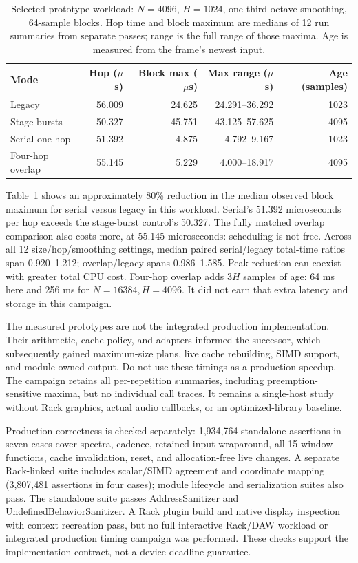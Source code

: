 \documentclass[11pt,letterpaper]{article}
\begin{document}
\begin{table}[tb]
\centering\small
\begin{tabular}{@{}lrrrr@{}}
\toprule
Mode & Hop ($\mu$s) & Block max ($\mu$s) & Max range ($\mu$s) & Age (samples) \\
\midrule
Legacy & 56.009 & 24.625 & 24.291--36.292 & 1023 \\
Stage bursts & 50.327 & 45.751 & 43.125--57.625 & 4095 \\
Serial one hop & 51.392 & 4.875 & 4.792--9.167 & 1023 \\
Four-hop overlap & 55.145 & 5.229 & 4.000--18.917 & 4095 \\
\bottomrule
\end{tabular}
\caption{Selected prototype workload: $N=4096$, $H=1024$, one-third-octave smoothing, 64-sample blocks. Hop time and block maximum are medians of 12 run summaries from separate passes; range is the full range of those maxima. Age is measured from the frame's newest input.}
\label{tab:pipeline}
\end{table}

Table~\ref{tab:pipeline} shows an approximately 80\% reduction in the median
observed block maximum for serial versus legacy in this workload. Serial's
51.392 microseconds per hop exceeds the stage-burst control's 50.327. The
fully matched overlap comparison also costs more, at 55.145 microseconds:
scheduling is not free. Across all 12 size/hop/smoothing settings, median paired
serial/legacy total-time ratios span 0.920--1.212; overlap/legacy spans
0.986--1.585. Peak reduction can coexist with greater total CPU cost. Four-hop
overlap adds $3H$ samples of age: 64 ms here and 256 ms for $N=16384,H=4096$.
It did not earn that extra latency and storage in this campaign.

The measured prototypes are not the integrated production implementation.
Their arithmetic, cache policy, and adapters informed the successor, which
subsequently gained maximum-size plans, live cache rebuilding, SIMD support,
and module-owned output. Do not use these timings as a production speedup.
The campaign retains all per-repetition summaries, including preemption-sensitive
maxima, but no individual call traces. It remains a single-host study without
Rack graphics, actual audio callbacks, or an optimized-library baseline.

Production correctness is checked separately: 1,934,764 standalone assertions
in seven cases cover spectra, cadence, retained-input wraparound, all 15 window
functions, cache invalidation, reset, and allocation-free live changes. A
separate Rack-linked suite includes scalar/SIMD agreement and coordinate
mapping (3,807,481 assertions in four cases); module lifecycle and serialization
suites also pass. The standalone suite passes AddressSanitizer and
UndefinedBehaviorSanitizer. A Rack plugin build and native display inspection
with context recreation pass, but no full interactive Rack/DAW workload or
integrated production timing campaign was performed. These checks support the
implementation contract, not a device deadline guarantee.
\end{document}
